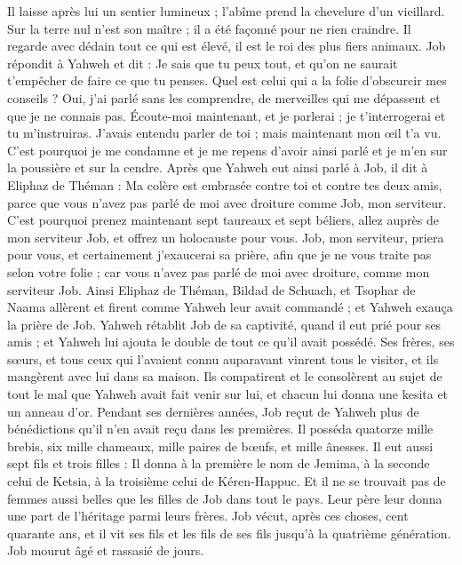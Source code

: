 \begin{multicols}{2}
Il laisse après lui un sentier lumineux ; l'abîme prend la chevelure d'un vieillard.
Sur la terre nul n'est son maître ; il a été façonné pour ne rien craindre.
Il regarde avec dédain tout ce qui est élevé, il est le roi des plus fiers animaux.
\VerseOne{}Job répondit à Yahweh et dit :
Je sais que tu peux tout, et qu'on ne saurait t'empêcher de faire ce que tu penses.
Quel est celui qui a la folie d'obscurcir mes conseils ? Oui, j'ai parlé sans les comprendre, de merveilles qui me dépassent et que je ne connais pas.
Écoute-moi maintenant, et je parlerai ; je t'interrogerai et tu m'instruiras.
J'avais entendu parler de toi ; mais maintenant mon œil t'a vu.
C'est pourquoi je me condamne et je me repens d'avoir ainsi parlé et je m'en sur la poussière et sur la cendre.
Après que Yahweh eut ainsi parlé à Job, il dit à Eliphaz de Théman : Ma colère est embrasée contre toi et contre tes deux amis, parce que vous n'avez pas parlé de moi avec droiture comme Job, mon serviteur.
 C'est pourquoi prenez maintenant sept taureaux et sept béliers, allez auprès de mon serviteur Job, et offrez un holocauste pour vous. Job, mon serviteur, priera pour vous, et certainement j'exaucerai sa prière, afin que je ne vous traite pas selon votre folie ; car vous n'avez pas parlé de moi avec droiture, comme mon serviteur Job.
 Ainsi Eliphaz de Théman, Bildad de Schuach, et Tsophar de Naama allèrent et firent comme Yahweh leur avait commandé ; et Yahweh exauça la prière de Job.
Yahweh rétablit Job de sa captivité, quand il eut prié pour ses amis ; et Yahweh lui ajouta le double de tout ce qu'il avait possédé.
Ses frères, ses sœurs, et tous ceux qui l'avaient connu auparavant vinrent tous le visiter, et ils mangèrent avec lui dans sa maison. Ils compatirent et le consolèrent au sujet de tout le mal que Yahweh avait fait venir sur lui, et chacun lui donna une kesita et un anneau d'or.
Pendant ses dernières années, Job reçut de Yahweh plus de bénédictions qu'il n'en avait reçu dans les premières. Il posséda quatorze mille brebis, six mille chameaux, mille paires de bœufs, et mille ânesses.
Il eut aussi sept fils et trois filles :
Il donna à la première le nom de Jemima, à la seconde celui de Ketsia, à la troisième celui de Kéren-Happuc.
Et il ne se trouvait pas de femmes aussi belles que les filles de Job dans tout le pays. Leur père leur donna une part de l'héritage parmi leurs frères.
Job vécut, après ces choses, cent quarante ans, et il vit ses fils et les fils de ses fils jusqu'à la quatrième génération.
 Job mourut âgé et rassasié de jours.
\PPE{}
\end{multicols}
